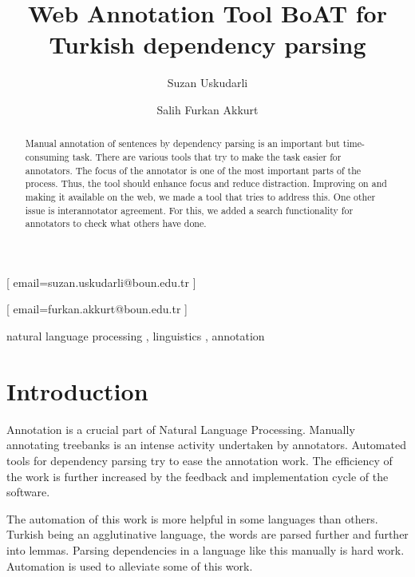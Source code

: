 \documentclass[
]{ceurart}
\begin{document}


\title{Web Annotation Tool BoAT for Turkish dependency parsing}

\author[1]{Suzan Uskudarli}[%
email=suzan.uskudarli@boun.edu.tr
]

\author[1]{Salih Furkan Akkurt}[%
email=furkan.akkurt@boun.edu.tr
]

\address[1]{ Department of Computer Engineering, Bogazici University, Bebek, 34342, İstanbul, Turkey }

\begin{abstract}
Manual annotation of sentences by dependency parsing is an important but time-consuming task. There are various tools that try to make the task easier for annotators. The focus of the annotator is one of the most important parts of the process. Thus, the tool should enhance focus and reduce distraction. Improving on and making it available on the web, we made a tool that tries to address this. One other issue is interannotator agreement. For this, we added a search functionality for annotators to check what others have done.
\end{abstract}

\begin{keywords}
natural language processing \sep
linguistics \sep
annotation
\end{keywords}

\maketitle

\section{Introduction}

Annotation is a crucial part of Natural Language Processing.
Manually annotating treebanks is an intense activity undertaken by annotators.
Automated tools for dependency parsing try to ease the annotation work.
The efficiency of the work is further increased by the feedback and implementation cycle of the software.

The automation of this work is more helpful in some languages than others.
Turkish being an agglutinative language, the words are parsed further and further into lemmas.
Parsing dependencies in a language like this manually is hard work.
Automation is used to alleviate some of this work.
\end{document}

